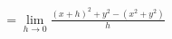 \documentclass[preview]{standalone}
\begin{document}
\begin{align*}
= \lim_{h \to 0} \frac{(x + h)^2 + y^2 - (x^2 + y^2)}{h}
\end{align*}
\end{document}
